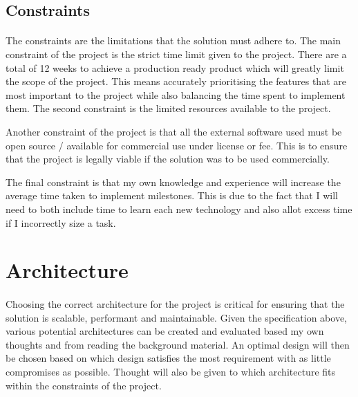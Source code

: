 \documentclass[12pt, conference, final, a4paper, onecolumn, compsoc]{IEEEtran}
\begin{document}
\subsection*{Constraints}
\paragraph{}

The constraints are the limitations that the solution must adhere to. The main
constraint of the project is the strict time limit given to the project. There
are a total of 12 weeks to achieve a production ready product which will greatly
limit the scope of the project. This means accurately prioritising the features
that are most important to the project while also balancing the time spent to
implement them. The second constraint is the limited resources available to the
project.


Another constraint of the project is that all the external software used must be
open source / available for commercial use under license or fee. This is to
ensure that the project is legally viable if the solution was to be used
commercially.

The final constraint is that my own knowledge and experience will increase the
average time taken to implement milestones. This is due to the fact that I will
need to both include time to learn each new technology and also allot excess
time if I incorrectly size a task.


\section{Architecture}

\paragraph{}
Choosing the correct architecture for the project is critical for ensuring that
the solution is scalable, performant and maintainable. Given the specification
above, various potential architectures can be created and evaluated based my own
thoughts and from reading the background material. An optimal design will then
be chosen based on which design satisfies the most requirement with as little
compromises as possible. Thought will also be given to which architecture fits
within the constraints of the project.

\end{document}
